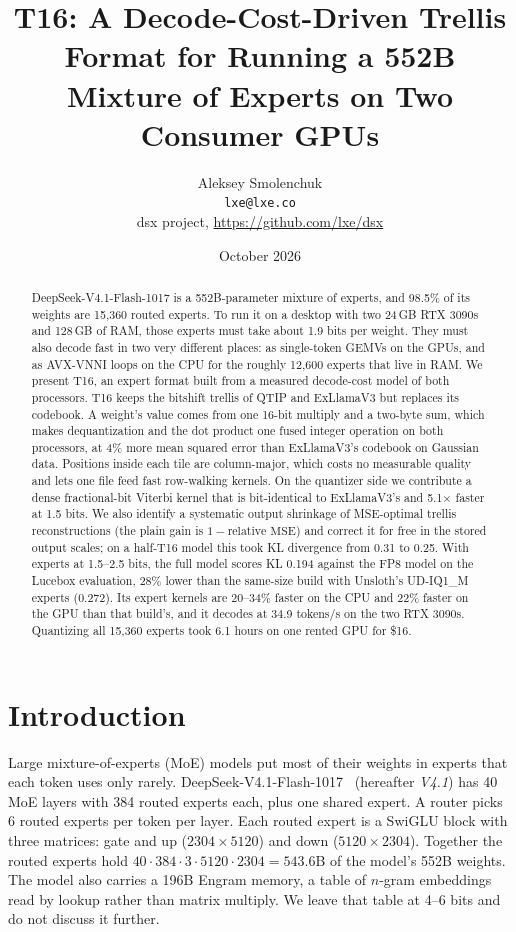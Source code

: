 \documentclass[10pt]{article}
\title{\textbf{T16: A Decode-Cost-Driven Trellis Format for Running a 552B\\Mixture of Experts on Two Consumer GPUs}}
\author{Aleksey Smolenchuk\\\texttt{lxe@lxe.co}\\[2pt]\small dsx project, \url{https://github.com/lxe/dsx}}
\date{October 2026}
\begin{document}
\maketitle

\begin{abstract}
DeepSeek-V4.1-Flash-1017 is a 552B-parameter mixture of experts, and 98.5\% of its weights are 15{,}360 routed
experts. To run it on a desktop with two 24\,GB RTX 3090s and 128\,GB of RAM, those experts must take about 1.9 bits
per weight. They must also decode fast in two very different places: as single-token GEMVs on the GPUs, and as AVX-VNNI
loops on the CPU for the roughly 12{,}600 experts that live in RAM.
We present T16, an expert format built from a measured decode-cost model of both processors. T16 keeps the bitshift
trellis of QTIP and ExLlamaV3 but replaces its codebook. A weight's value comes from one 16-bit multiply and a
two-byte sum, which makes dequantization and the dot product one fused integer operation on both processors, at 4\%
more mean squared error than ExLlamaV3's codebook on Gaussian data. Positions inside each tile are column-major, which
costs no measurable quality and lets one file feed fast row-walking kernels.
On the quantizer side we contribute a dense fractional-bit Viterbi kernel that is bit-identical to ExLlamaV3's and
5.1$\times$ faster at 1.5 bits. We also identify a systematic output shrinkage of MSE-optimal trellis reconstructions
(the plain gain is $1-\text{relative MSE}$) and correct it for free in the stored output scales; on a half-T16 model
this took KL divergence from 0.31 to 0.25. With experts at 1.5--2.5 bits, the full model scores KL 0.194 against the
FP8 model on the Lucebox evaluation, 28\% lower than the same-size build with Unsloth's UD-IQ1\_M experts (0.272).
Its expert kernels are 20--34\% faster on the CPU and 22\% faster on the GPU than that build's, and it decodes at
34.9 tokens/s on the two RTX 3090s. Quantizing all 15{,}360 experts took 6.1 hours on one rented GPU for \$16.
\end{abstract}

\section{Introduction}

Large mixture-of-experts (MoE) models put most of their weights in experts that each token uses only rarely.
DeepSeek-V4.1-Flash-1017~\cite{dsv41} (hereafter \emph{V4.1}) has 40 MoE layers with 384 routed experts each, plus one
shared expert. A router picks 6 routed experts per token per layer. Each routed expert is a SwiGLU block with three
matrices: gate and up ($2304 \times 5120$) and down ($5120 \times 2304$). Together the routed experts hold
$40 \cdot 384 \cdot 3 \cdot 5120 \cdot 2304 = 543.6$B of the model's 552B weights. The model also carries a 196B
Engram memory, a table of $n$-gram embeddings read by lookup rather than matrix multiply. We leave that table at 4--6
bits and do not discuss it further.
\end{document}

